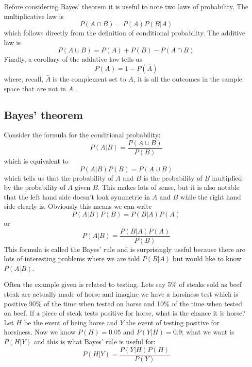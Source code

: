 \documentclass[11pt,a4paper]{scrartcl}
\begin{document}
Before considering Bayes' theorem it is useful to note two laws of probability. The multiplicative law is
\begin{equation}
P(A\cap B)=P(A)P(B|A)
\end{equation}
which follows directly from the definition of conditional probability. The additive law is
\begin{equation}
P(A\cup B)=P(A)+P(B)-P(A\cap B)
\end{equation}
Finally, a corollary of the addative law tells us
\begin{equation}
P(A)=1-P(\bar{A})
\end{equation}
where, recall, $\bar{A}$ is the complement set to $A$, it is all the
outcomes in the sample space that are not in $A$.

\subsection*{Bayes' theorem}

Consider the formula for the conditional probability:
\begin{equation}
P(A|B)=\frac{P(A\cup B)}{P(B)}
\end{equation}
which is equivalent to
\begin{equation}
P(A|B)P(B)=P(A\cup B)
\end{equation}
which tells us that the probability of $A$ and $B$ is the probability
of $B$ multiplied by the probability of $A$ given $B$. This makes lots
of sense, but it is also notable that the left hand side doesn't look
symmetric in $A$ and $B$ while the right hand side clearly
is. Obviously this means we can write
\begin{equation}
P(A|B)P(B)=P(B|A)P(A)
\end{equation}
or
\begin{equation}
P(A|B)=\frac{P(B|A)P(A)}{P(B)}
\end{equation}
This formula is called the Bayes' rule and is surprisingly useful
because there are lots of interesting problems where we are told
$P(B|A)$ but would like to know $P(A|B)$.

Often the example given is related to testing. Lets say 5\% of steaks
sold as beef steak are actually made of horse and imagine we have a
horsiness test which is positive 90\% of the time when tested on horse
and 10\% of the time when tested on beef. If a piece of steak tests
positive for horse, what is the chance it is horse? Let $H$ be the
event of being horse and $Y$ the event of testing positive for
horsiness. Now we know $P(H)=0.05$ and $P(Y|H)=0.9$; what we want is
$P(H|Y)$ and this is what Bayes' rule is useful for:
\begin{equation}
P(H|Y)=\frac{P(Y|H)P(H)}{P(Y)}
\end{equation}
\end{document}
